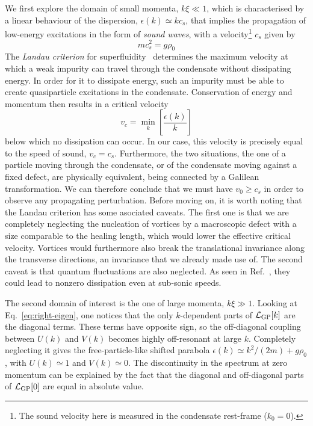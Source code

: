 We first explore the domain of small momenta, $k\xi \ll 1$, which is
characterised by a linear behaviour of the dispersion,
$\epsilon(k) \simeq k c_s$, that implies the propagation of low-energy
excitations in the form of \textit{sound waves}, with a
velocity\footnote{The sound velocity here is measured in the
  condensate rest-frame ($k_0 = 0$).} $c_s$ given by
%
\begin{equation}\label{eq:sound-velocity}
  mc^2_s = g \rho_0
\end{equation}
% 
The \textit{Landau criterion} for superfluidity~\cite{Landau:213304}
determines the maximum velocity at which a weak impurity can travel
through the condensate without dissipating energy. In order for it to
dissipate energy, such an impurity must be able to create
quasiparticle excitations in the condensate. Conservation of energy
and momentum then results in a critical velocity
%
\begin{equation}\label{eq:Landau}
  v_c=\min_{k} \left[\frac{\epsilon(k)}{k}\right]
\end{equation}
% 
below which no dissipation can occur. In our case, this velocity is
precisely equal to the speed of sound, $v_c =
c_s$. Furthermore, the two situations, the one of a particle moving
through the condensate, or of the condensate moving against a fixed
defect, are physically equivalent, being connected by a Galilean
transformation. We can therefore conclude that we must have
$v_0 \geq c_s$ in order to observe any propagating
perturbation. Before moving on, it is worth noting that the Landau
criterion has some asociated caveats. The first one is that we are
completely neglecting the nucleation of vortices by a macroscopic
defect with a size comparable to the healing length, which would lower
the effective critical velocity. Vortices would furthermore also break
the translational invariance along the transverse directions, an
invariance that we already made use of. The second caveat is that
quantum fluctuations are also neglected. As seen in
Ref.~\cite{Astrakharchik_2004}, they could lead to nonzero dissipation
even at sub-sonic speeds.

The second domain of interest is the one of large momenta,
$k\xi \gg 1$. Looking at Eq.~\eqref{eq:right-eigen}, one notices that
the only $k$-dependent parts of $\mathcal{L}_{\text{GP}} [k]$ are the
diagonal terms. These terms have opposite sign, so the off-diagonal
coupling between $U(k)$ and $V(k)$ becomes highly off-resonant at
large $k$. Completely neglecting it gives the free-particle-like
shifted parabola $\epsilon(k) \simeq k^2/(2m)+g\rho_0$, with
$U(k) \simeq 1$ and $V(k) \simeq 0$.
%
The discontinuity in the spectrum at zero momentum can be explained by
the fact that the diagonal and off-diagonal parts of $\mathcal{L}_{\text{GP}}
[0]$ are equal in absolute value.


